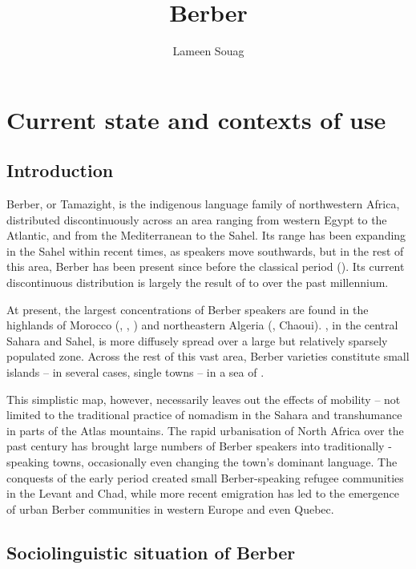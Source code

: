 \documentclass[output=paper]{langsci/langscibook}
\author{Lameen Souag\affiliation{CNRS, LACITO}}
\title{Berber}
\begin{document}
\maketitle 
  


 \section{Current state and contexts of use}


 \subsection{Introduction}


Berber, or {Tamazight}, is the indigenous language family of northwestern Africa, distributed discontinuously across an area ranging from western Egypt to the Atlantic, and from the Mediterranean to the Sahel. Its range has been expanding in the Sahel within recent times, as  speakers move southwards, but in the rest of this area, Berber has been present since before the classical period (\citealt{MúrciaSánchez2010}). Its current discontinuous distribution is largely the result of  to  over the past millennium.

At present, the largest concentrations of Berber speakers are found in the highlands of Morocco (, , ) and northeastern Algeria (, Chaoui). , in the central Sahara and Sahel, is more diffusely spread over a large but relatively sparsely populated zone. Across the rest of this vast area, Berber varieties constitute small islands – in several cases, single towns – in a sea of .

This simplistic map, however, necessarily leaves out the effects of mobility – not limited to the traditional practice of nomadism in the Sahara and transhumance in parts of the Atlas mountains. The rapid urbanisation of North Africa over the past century has brought large numbers of Berber speakers into traditionally -speaking towns, occasionally even changing the town's dominant language. The conquests of the early  period created small Berber-speaking refugee communities in the Levant and Chad, while more recent emigration has led to the emergence of urban Berber communities in western Europe and even Quebec.


 
 \subsection{Sociolinguistic situation of Berber}
\end{document}
